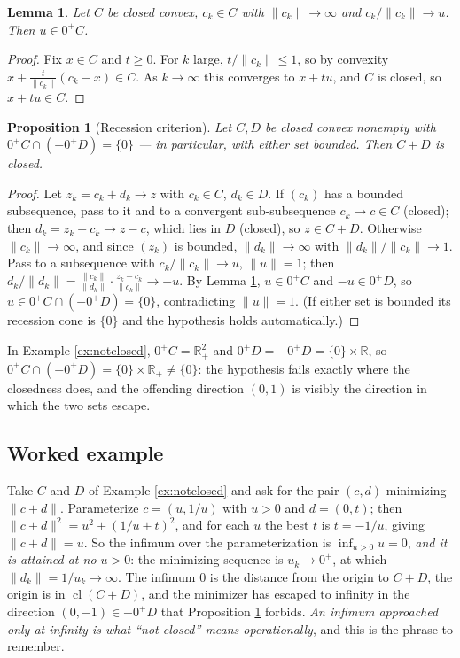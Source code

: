 \documentclass[11pt,a4paper]{article}
\theoremstyle{definition}
\theoremstyle{plain}
\newtheorem{lemma}[theorem]{Lemma}
\newtheorem{proposition}[theorem]{Proposition}
\theoremstyle{remark}
\newcommand{\R}{\mathbb{R}}
\newcommand{\norm}[1]{\lVert #1\rVert}
\DeclareMathOperator{\cl}{cl}
\begin{document}
\begin{lemma}
\label{lem:reclimit}
Let $C$ be closed convex, $c_k\in C$ with $\norm{c_k}\to\infty$ and $c_k/\norm{c_k}\to u$. Then
$u\in0^+C$.
\end{lemma}

\begin{proof}
Fix $x\in C$ and $t\ge0$. For $k$ large, $t/\norm{c_k}\le1$, so by convexity
$x+\tfrac{t}{\norm{c_k}}(c_k-x)\in C$. As $k\to\infty$ this converges to $x+tu$, and $C$ is
closed, so $x+tu\in C$.
\end{proof}

\begin{proposition}[Recession criterion]
\label{prop:recession}
Let $C,D$ be closed convex nonempty with $0^+C\cap(-0^+D)=\{0\}$ --- in particular, with either
set bounded. Then $C+D$ is closed.
\end{proposition}

\begin{proof}
Let $z_k=c_k+d_k\to z$ with $c_k\in C$, $d_k\in D$. If $(c_k)$ has a bounded subsequence, pass
to it and to a convergent sub-subsequence $c_k\to c\in C$ (closed); then $d_k=z_k-c_k\to z-c$,
which lies in $D$ (closed), so $z\in C+D$. Otherwise $\norm{c_k}\to\infty$, and since $(z_k)$ is
bounded, $\norm{d_k}\to\infty$ with $\norm{d_k}/\norm{c_k}\to1$. Pass to a subsequence with
$c_k/\norm{c_k}\to u$, $\norm u=1$; then
$d_k/\norm{d_k}=\tfrac{\norm{c_k}}{\norm{d_k}}\cdot\tfrac{z_k-c_k}{\norm{c_k}}\to-u$. By Lemma
\ref{lem:reclimit}, $u\in0^+C$ and $-u\in0^+D$, so $u\in0^+C\cap(-0^+D)=\{0\}$, contradicting
$\norm u=1$. (If either set is bounded its recession cone is $\{0\}$ and the hypothesis holds
automatically.)
\end{proof}

In Example \ref{ex:notclosed}, $0^+C=\R_+^2$ and $0^+D=-0^+D=\{0\}\times\R$, so
$0^+C\cap(-0^+D)=\{0\}\times\R_+\ne\{0\}$: the hypothesis fails exactly where the closedness
does, and the offending direction $(0,1)$ is visibly the direction in which the two sets escape.

\subsection*{Worked example}

Take $C$ and $D$ of Example \ref{ex:notclosed} and ask for the pair $(c,d)$ minimizing
$\norm{c+d}$. Parameterize $c=(u,1/u)$ with $u>0$ and $d=(0,t)$; then
$\norm{c+d}^2=u^2+(1/u+t)^2$, and for each $u$ the best $t$ is $t=-1/u$, giving $\norm{c+d}=u$.
So the infimum over the parameterization is $\inf_{u>0}u=0$, \emph{and it is attained at no
$u>0$}: the minimizing sequence is $u_k\to0^+$, at which $\norm{d_k}=1/u_k\to\infty$. The
infimum $0$ is the distance from the origin to $C+D$, the origin is in $\cl(C+D)$, and the
minimizer has escaped to infinity in the direction $(0,-1)\in-0^+D$ that Proposition
\ref{prop:recession} forbids. \emph{An infimum approached only at infinity is what ``not
closed'' means operationally}, and this is the phrase to remember.
\end{document}
